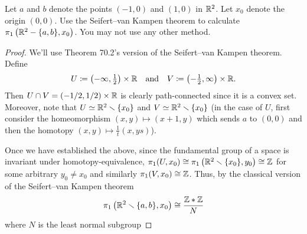 \begin{problem}
Let $a$ and $b$ denote the points $(-1,0)$ and $(1,0)$ in $\mathbb{R}^2$. Let
$x_0$ denote the origin $(0,0)$. Use the Seifert--van Kampen theorem to
calculate $\pi_1\left(\mathbb{R}^2-\{a,b\},x_0\right)$. You may not use any other
method.
\end{problem}
\begin{proof}
We'll use Theorem 70.2's version of the Seifert--van Kampen theorem. Define
\[
U\coloneqq\left(-\infty,\tfrac{1}{2}\right)\times\mathbb{R}
\quad\text{and}\quad
V\coloneqq\left(-\tfrac{1}{2},\infty\right)\times\mathbb{R}.
\]
Then $U\cap V=(-1/2,1/2)\times\mathbb{R}$ is clearly path-connected since it is a
convex set. Moreover, note that $U\simeq\bbR^2\minus\{x_0\}$ and
$V\simeq\bbR^2\minus\{x_0\}$ (in the case of $U$, first consider the
homeomorphism $(x,y)\mapsto(x+1,y)$ which sends $a$ to $(0,0)$ and then the
homotopy $(x,y)\mapsto\tfrac{1}{t}(x,ys)$).

Once we have established the above, since the fundamental group of a space
is invariant under homotopy-equivalence,
$\pi_1(U,x_0)\cong\pi_1\left(\bbR^2\minus\{x_0\},y_0\right)\cong\bbZ$ for some
arbitrary $y_0\neq x_0$ and similarly $\pi_1(V,x_0)\cong\mathbb{Z}$. Thus, by the
classical version of the Seifert--van Kampen theorem
\[
\pi_1\left(\bbR^2\minus\{a,b\},x_0\right)\cong
\frac{\bbZ*\bbZ}{N}
\]
where $N$ is the least normal subgroup
\end{proof}

